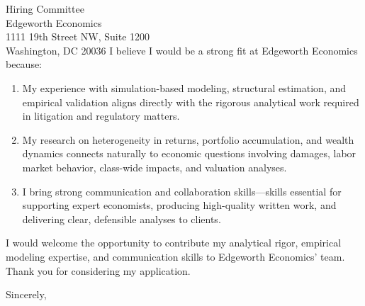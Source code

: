 \documentclass[11pt,letterpaper]{letter}
\begin{document}
\begin{letter}{Hiring Committee \\
Edgeworth Economics \\
1111 19th Street NW, Suite 1200 \\
Washington, DC 20036}
I believe I would be a strong fit at Edgeworth Economics because:
\begin{enumerate}
    \item My experience with simulation-based modeling, structural estimation, and empirical validation aligns directly with the rigorous analytical work required in litigation and regulatory matters.
    \item My research on heterogeneity in returns, portfolio accumulation, and wealth dynamics connects naturally to economic questions involving damages, labor market behavior, class-wide impacts, and valuation analyses.
    \item I bring strong communication and collaboration skills—skills essential for supporting expert economists, producing high-quality written work, and delivering clear, defensible analyses to clients.
\end{enumerate}

I would welcome the opportunity to contribute my analytical rigor, empirical modeling expertise, and communication skills to Edgeworth Economics’ team. Thank you for considering my application.

\closing{Sincerely,}

\end{letter}
\end{document}
